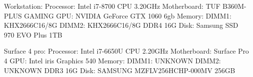 Workstation:
Processor: Intel i7-8700 CPU 3.20GHz
Motherboard: TUF B360M-PLUS GAMING
GPU: NVIDIA GeForce GTX 1060 6gb
Memory: DIMM1: KHX2666C16/8G DIMM2: KHX2666C16/8G DDR4 16G
Disk: Samsung SSD 970 EVO Plus 1TB 

Surface 4 pro:
Processor: Intel i7-6650U CPU 2.20GHz
Motherboard: Surface Pro 4
GPU: Intel iris Graphics 540
Memory: DIMM1: UNKNOWN DIMM2: UNKNOWN DDR3 16G 
Disk: SAMSUNG MZFLV256HCHP-000MV 256GB


\cite{sestoft2013microbenchmarks} \cite{fahad2019comparative} \cite{Bokhari2020r3}
